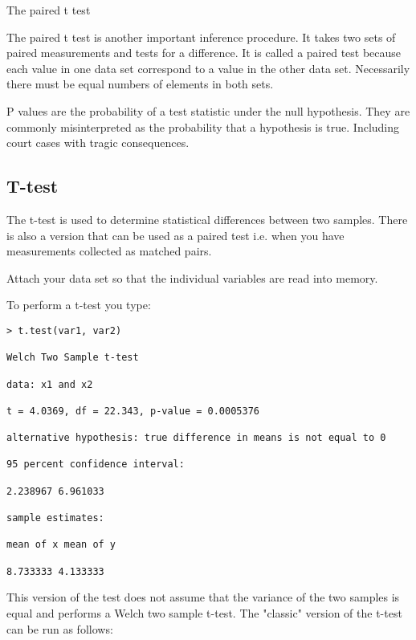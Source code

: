 The paired t test 

The paired t test is another important inference procedure. It takes two sets of paired measurements and tests for a difference. It is called a paired test because each value in one data set  correspond to a value in the other data set. Necessarily there must be equal numbers of elements in both sets.


P values are the probability of a test statistic under the null hypothesis. They are commonly misinterpreted as the probability that a hypothesis is true. Including court cases with tragic consequences.




\subsection{T-test}

The t-test is used to determine statistical differences between two samples. There is also a version that can be used as a paired test i.e. when you have measurements collected as matched pairs.


Attach your data set so that the individual variables are read into memory.

To perform a t-test you type:

\begin{framed}
\begin{verbatim}
> t.test(var1, var2)

Welch Two Sample t-test

data: x1 and x2

t = 4.0369, df = 22.343, p-value = 0.0005376

alternative hypothesis: true difference in means is not equal to 0

95 percent confidence interval:

2.238967 6.961033

sample estimates:

mean of x mean of y

8.733333 4.133333

\end{verbatim}
\end{framed}

This version of the test does not assume that the variance of the two samples is equal and performs a Welch two sample t-test. The "classic" version of the t-test can be run as follows:

